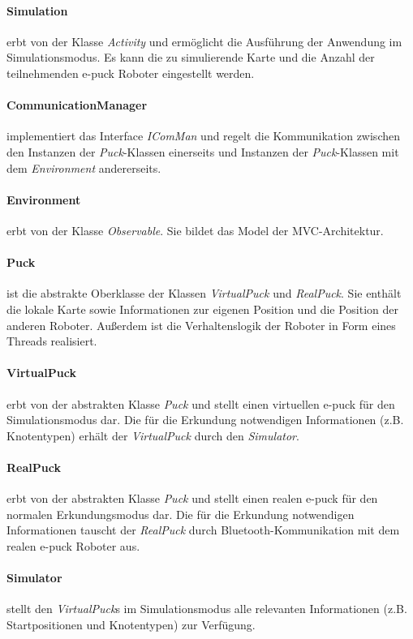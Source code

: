 \documentclass[10pt,a4paper]{article}
\begin{document}
			\paragraph*{\textbf{Simulation}} erbt von der Klasse \textit{Activity} und ermöglicht die Ausführung der Anwendung im Simulationsmodus.
			Es kann die zu simulierende Karte und die Anzahl der teilnehmenden e-puck Roboter eingestellt werden.
			\paragraph*{\textbf{CommunicationManager}} implementiert das Interface \textit{IComMan} und regelt die Kommunikation zwischen den Instanzen der
			\textit{Puck}-Klassen einerseits und Instanzen der \textit{Puck}-Klassen mit dem \textit{Environment} andererseits.
			\paragraph*{\textbf{Environment}} erbt von der Klasse \textit{Observable}. Sie bildet das Model der MVC-Architektur.
			\paragraph*{\textbf{Puck}} ist die abstrakte Oberklasse der Klassen \textit{VirtualPuck} und \textit{RealPuck}. Sie enthält die lokale Karte
			sowie Informationen zur eigenen Position und die Position der anderen Roboter. Außerdem ist die Verhaltenslogik der Roboter in Form eines Threads
			realisiert.
			\paragraph*{\textbf{VirtualPuck}} erbt von der abstrakten Klasse \textit{Puck} und stellt einen virtuellen e-puck für den Simulationsmodus dar.
			Die für die Erkundung notwendigen Informationen (z.B. Knotentypen) erhält der \textit{VirtualPuck} durch den \textit{Simulator}.
			\paragraph*{\textbf{RealPuck}} erbt von der abstrakten Klasse \textit{Puck} und stellt einen realen e-puck für den normalen Erkundungsmodus
			dar. Die für die Erkundung notwendigen Informationen tauscht der \textit{RealPuck} durch Bluetooth-Kommunikation mit dem realen e-puck Roboter
			aus.
			\paragraph*{\textbf{Simulator}} stellt den \textit{VirtualPuck}s im Simulationsmodus alle relevanten Informationen (z.B. Startpositionen und
			Knotentypen) zur Verfügung.
\end{document}
